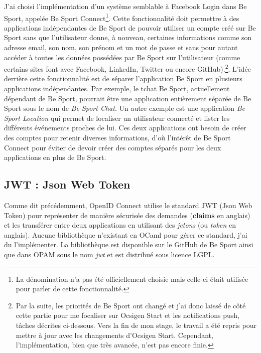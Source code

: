 J'ai choisi l'implémentation d'un système semblable à Facebook
Login\cite{facebook-login} dans Be Sport, appelée Be Sport Connect\footnote{La dénomination n'a pas été officiellement
  choisie mais celle-ci était utilisée pour parler de cette fonctionnalité.}.
Cette fonctionnalité doit permettre à des applications indépendantes de Be Sport
de pouvoir utiliser un compte créé sur Be Sport sans que l'utilisateur donne, à
nouveau, certaines informations comme son adresse email, son nom, son prénom et
un mot de passe et sans pour autant accéder à
toutes les données possédées par Be Sport sur l'utilisateur (comme certains
sites font avec Facebook, LinkedIn, Twitter ou encore GitHub).\footnote{Par la
suite, les
  priorités de Be Sport ont changé
  et j'ai donc laissé de côté cette partie pour me focaliser sur Ocsigen Start
  et les notifications push, tâches décrites ci-dessous. Vers la fin de mon
  stage, le travail a été repris pour mettre à jour avec les changements
  d'Ocsigen Start. Cependant, l'implémentation, bien que très avancée, n'est pas
encore finie.}.
L'idée derrière cette fonctionnalité est de séparer l'application Be Sport en
plusieurs applications indépendantes. Par exemple, le tchat Be Sport, actuellement
dépendant de Be Sport, pourrait être une application entièrement séparée de Be
Sport sous le nom de \emph{Be Sport Chat}. Un autre exemple est une application
\emph{Be Sport Location} qui permet de localiser un utilisateur connecté et
lister les différents événements proches de lui. Ces deux applications ont
besoin de créer des comptes pour retenir diverses informations, d'où l'intérêt
de Be Sport Connect pour éviter de devoir créer des comptes séparés pour les
deux applications en plus de Be Sport.


\subsection{JWT : Json Web Token}

Comme dit précédemment, OpenID Connect utilise le standard JWT (Json Web
Token)\cite{official-jwt-website, official-openid-connect-website, rfc-jwt}
pour représenter de manière sécurisée des demandes (\textbf{claims} en anglais) et les
transférer entre deux applications en utilisant des \textit{jetons} (ou
\textit{token} en anglais).
Aucune bibliothèque n'existant en OCaml pour gérer ce standard, j'ai du
l'implémenter. La bibliothèque est disponible sur le GitHub de Be
Sport\cite{ocaml-jwt-github} ainsi que
dans OPAM sous le nom \emph{jwt} et est distribué sous licence LGPL.

